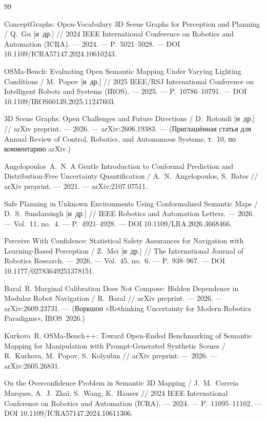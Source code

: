 \begin{thebibliography}{99}
\footnotesize

 ConceptGraphs: Open-Vocabulary 3D Scene Graphs for Perception and Planning / Q.~Gu [и~др.] // 2024 IEEE International Conference on Robotics and Automation (ICRA). --- 2024. --- P.~5021--5028. --- DOI 10.1109/ICRA57147.2024.10610243.

 OSMa-Bench: Evaluating Open Semantic Mapping Under Varying Lighting Conditions / M.~Popov [и~др.] // 2025 IEEE/RSJ International Conference on Intelligent Robots and Systems (IROS). --- 2025. --- P.~10786--10791. --- DOI 10.1109/IROS60139.2025.11247603.

 3D Scene Graphs: Open Challenges and Future Directions / D.~Rotondi [и~др.] // arXiv preprint. --- 2026. --- arXiv:2606.19383. --- (Приглашённая статья для Annual Review of Control, Robotics, and Autonomous Systems, т.~10, по комментарию arXiv.)

 Angelopoulos~A.~N. A Gentle Introduction to Conformal Prediction and Distribution-Free Uncertainty Quantification / A.~N.~Angelopoulos, S.~Bates // arXiv preprint. --- 2021. --- arXiv:2107.07511.

 Safe Planning in Unknown Environments Using Conformalized Semantic Maps / D.~S.~Sundarsingh [и~др.] // IEEE Robotics and Automation Letters. --- 2026. --- Vol.~11, no.~4. --- P.~4921--4928. --- DOI 10.1109/LRA.2026.3668466.

 Perceive With Confidence: Statistical Safety Assurances for Navigation with Learning-Based Perception / Z.~Mei [и~др.] // The International Journal of Robotics Research. --- 2026. --- Vol.~45, no.~6. --- P.~938--967. --- DOI 10.1177/02783649251378151.

 Baral~R. Marginal Calibration Does Not Compose: Hidden Dependence in Modular Robot Navigation / R.~Baral // arXiv preprint. --- 2026. --- arXiv:2609.23731. --- (Воркшоп «Rethinking Uncertainty for Modern Robotics Paradigms», IROS~2026.)

 Kurkova~R. OSMa-Bench++: Toward Open-Ended Benchmarking of Semantic Mapping for Manipulation with Prompt-Generated Synthetic Scenes / R.~Kurkova, M.~Popov, S.~Kolyubin // arXiv preprint. --- 2026. --- arXiv:2605.26831.

 On the Overconfidence Problem in Semantic 3D Mapping / J.~M.~Correia Marques, A.~J.~Zhai, S.~Wang, K.~Hauser // 2024 IEEE International Conference on Robotics and Automation (ICRA). --- 2024. --- P.~11095--11102. --- DOI 10.1109/ICRA57147.2024.10611306.


\end{thebibliography}
